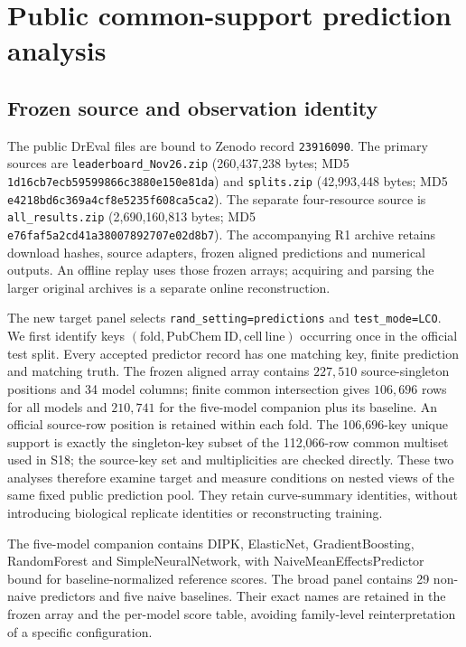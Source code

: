 \section{Public common-support prediction analysis}\label{sec:s17}
\subsection{Frozen source and observation identity}
The public DrEval files are bound to Zenodo record \nolinkurl{23916090}. The primary sources are \nolinkurl{leaderboard_Nov26.zip} (260,437,238 bytes; MD5 \nolinkurl{1d16cb7ecb59599866c3880e150e81da}) and \nolinkurl{splits.zip} (42,993,448 bytes; MD5 \nolinkurl{e4218bd6c369a4cf8e5235f608ca5ca2}). The separate four-resource source is \nolinkurl{all_results.zip} (2,690,160,813 bytes; MD5 \nolinkurl{e76faf5a2cd41a38007892707e02d8b7}). The accompanying R1 archive retains download hashes, source adapters, frozen aligned predictions and numerical outputs. An offline replay uses those frozen arrays; acquiring and parsing the larger original archives is a separate online reconstruction.

The new target panel selects \texttt{rand\_setting=predictions} and \texttt{test\_mode=LCO}. We first identify keys $(\mathrm{fold},\mathrm{PubChem\ ID},\mathrm{cell\ line})$ occurring once in the official test split. Every accepted predictor record has one matching key, finite prediction and matching truth. The frozen aligned array contains $227{,}510$ source-singleton positions and 34 model columns; finite common intersection gives $106{,}696$ rows for all models and $210{,}741$ for the five-model companion plus its baseline. An official source-row position is retained within each fold. The 106,696-key unique support is exactly the singleton-key subset of the 112,066-row common multiset used in S18; the source-key set and multiplicities are checked directly. These two analyses therefore examine target and measure conditions on nested views of the same fixed public prediction pool. They retain curve-summary identities, without introducing biological replicate identities or reconstructing training.

The five-model companion contains DIPK, ElasticNet, GradientBoosting, RandomForest and SimpleNeuralNetwork, with NaiveMeanEffectsPredictor bound for baseline-normalized reference scores. The broad panel contains 29 non-naive predictors and five naive baselines. Their exact names are retained in the frozen array and the per-model score table, avoiding family-level reinterpretation of a specific configuration.

